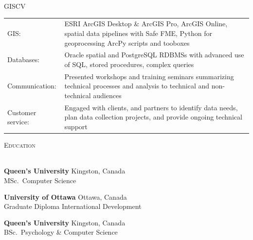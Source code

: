 \documentclass[letterpaper]{article}
\newcommand{\lineunder} {
        \vspace*{-8pt} \\
        \hspace*{-18pt} \hrulefill \\
    }
\newcommand{\header} [1] {
        \vspace{3pt}
        {\hspace*{-18pt}\vspace*{6pt} \textsc{#1}}
        \vspace*{-6pt} \lineunder
        \vspace{3pt}
    }
\newcommand{\university}[3]{
        \textbf{#1}  %
        \hfill #2\\  %
        #3\\         %
        \vspace{2mm}
    }
\newenvironment{skillslist}
        {
            \begin{tabular}[t]{ l L{5.17in} }
        }{
            \end{tabular}
        }
\begin{document}
    \begin{taggedblock}{GISCV}
        \begin{skillslist}
            GIS:& 
                ESRI ArcGIS Desktop \& ArcGIS Pro, ArcGIS Online, spatial data
                pipelines with Safe FME, 
                Python for geoprocessing ArcPy scripts and tooboxes
                \\
            Databases:& 
                Oracle spatial and PostgreSQL RDBMSs with advanced use of SQL,
                stored procedures, complex queries
                \\
            Communication: &
                Presented workshops and training seminars summarizing technical
                processes and analysis to technical and non-technical audiences
                \\
            Customer service: &
                Engaged with clients, and partners to identify data needs, plan data
                collection projects, and provide ongoing technical support
                \\
        \end{skillslist}
    \end{taggedblock}



\header{Education}
    \university
        {Queen's University}
        {Kingston, Canada}
        {MSc.~Computer Science}

    \university
        {University of Ottawa}
        {Ottawa, Canada}
        {Graduate Diploma International Development}

    \university
        {Queen's University}
        {Kingston, Canada}
        {BSc.~Psychology \& Computer Science}
\end{document}
